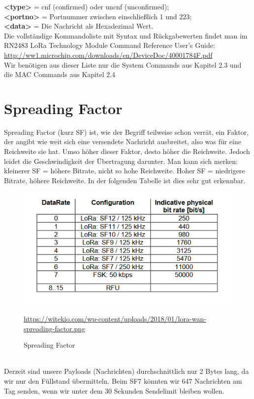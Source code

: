 \textbf{<type>} = cnf (confirmed) oder uncnf (unconfirmed);\\

\textbf{<portno>} = Portnummer zwischen einschließlich 1 und 223;\\

\textbf{<data>} = Die Nachricht als Hexadezimal Wert.\\

Die vollständige Kommandoliste mit Syntax und Rückgabewerten findet man im RN2483 LoRa Technology Module Command Reference User’s Guide: \url{http://ww1.microchip.com/downloads/en/DeviceDoc/40001784F.pdf}\\
Wir benötigen aus dieser Liste nur die System Commands aus Kapitel 2.3 und die MAC Commands aus Kapitel 2.4

\section{Spreading Factor}
Spreading Factor (kurz SF) ist, wie der Begriff teilweise schon verrät, ein Faktor, der angibt wie weit sich eine versendete Nachricht ausbreitet, also was für eine Reichweite sie hat. Umso höher dieser Faktor, desto höher die Reichweite. Jedoch leidet die Geschwindigkeit der Übertragung darunter. Man kann sich merken: kleinerer SF = höhere Bitrate, nicht so hohe Reichweite. Hoher SF = niedrigere Bitrate, höhere Reichweite. In der folgenden Tabelle ist dies sehr gut erkennbar. 
\begin{figure}[ht]
    \center
    \includegraphics[width=15cm]{Bilder/lora-10.png}\\
    \caption{Spreading Factor}
    \begin{center} \quelle\url{https://witekio.com/wp-content/uploads/2018/01/lora-wan-spreading-factor.png} \end{center}
        \label{fig:spreading-factor}
\end{figure}\\
Derzeit sind unsere Payloads (Nachrichten) durchschnittlich nur 2 Bytes lang, da wir nur den Füllstand übermitteln. Beim SF7 könnten wir 647 Nachrichten am Tag senden, wenn wir unter dem 30 Sekunden Sendelimit bleiben wollen.\\

